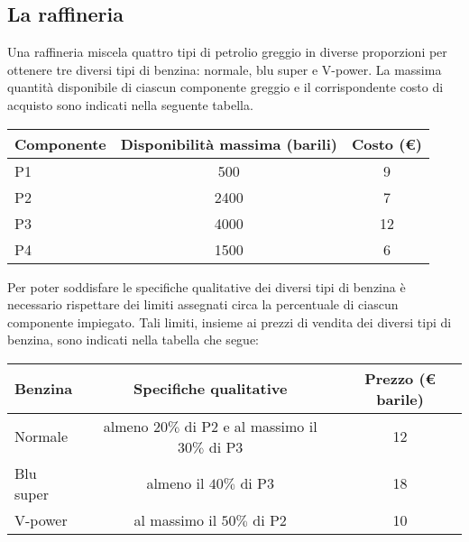 \documentclass[a4paper]{extarticle}
\renewcommand\arraystretch{}
\begin{document}
\vspace{1em}
\noindent
\subsection{La raffineria}
Una raffineria miscela quattro tipi di petrolio greggio in diverse proporzioni per ottenere tre diversi tipi di benzina: normale, blu super e V-power. La massima quantità disponibile di ciascun componente greggio e il corrispondente costo di acquisto sono indicati nella seguente tabella.

\begin{table}[H]
\setlength{\tabcolsep}{8pt}
\renewcommand{\arraystretch}{1.5}
\noindent
\centering
\begin{tabular}{l|cc}
    Componente & Disponibilità massima (barili) & Costo (€)\\
    \hline
    P1 & 500  & 9\\
    P2 & 2400 & 7\\
    P3 & 4000 & 12\\
    P4 & 1500 & 6\\
\end{tabular}
\end{table}

\vspace{1em}
\noindent
Per poter soddisfare le specifiche qualitative dei diversi tipi di benzina è necessario rispettare dei limiti assegnati circa la percentuale di ciascun componente impiegato. Tali limiti, insieme ai prezzi di vendita dei diversi tipi di benzina, sono indicati nella tabella che segue:

\begin{table}[H]
\setlength{\tabcolsep}{8pt}
\renewcommand{\arraystretch}{1.5}
\noindent
\centering
\begin{tabular}{l|c|c}
    Benzina & Specifiche qualitative & Prezzo (€ barile)\\
    \hline
    Normale   & almeno $20\%$ di P2 e al massimo il $30\%$ di P3  & 12\\
    Blu super & almeno il $40\%$ di P3 & 18\\
    V-power   & al massimo il $50\%$ di P2 & 10\\
\end{tabular}
\end{table}
\end{document}
